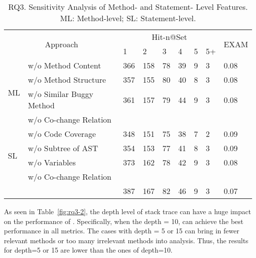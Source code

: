 \begin{table}[t]
	\caption{RQ3. Sensitivity Analysis of Method- and Statement- Level Features. ML: Method-level; SL: Statement-level.}
	{\small
		\begin{center}
			\renewcommand{\arraystretch}{1}
			\begin{tabular}{p{0.3cm}<{\centering}|p{3cm}|p{0.3cm}<{\centering}|p{0.3cm}<{\centering}|p{0.2cm}<{\centering}|p{0.2cm}<{\centering}|p{0.15cm}<{\centering}|p{0.15cm}<{\centering}|p{0.7cm}<{\centering}}
				\hline
				\multicolumn{2}{c|}{\multirow{2}{*}{Approach}}    & \multicolumn{6}{c|}{Hit-n@Set}& \multirow{2}{*}{EXAM}\\
				\cline{3-8}
				                 \multicolumn{2}{c|}{}   &1&2&3&4&5&5+&\\
				
				\hline 
				\multirow{4}{*}{ML}&w/o Method Content              & 366 & 158 & 78  & 39 & 9 & 3   & 0.08\\\cline{2-9}
				&w/o	Method Structure	                        & 357 & 155 & 80  & 40 & 8 & 3   & 0.08\\ \cline{2-9}
				&w/o Similar Buggy Method    	& 361 & 157 & 79  & 44 & 9 & 3   & 0.08\\ \cline{2-9}
				&w/o Co-change Relation          &  &  &   &  &  &    & \\ \cline{2-9}
				\hline
				\multirow{4}{*}{SL}&w/o Code Coverage               & 348 & 151 & 75  & 38 & 7 & 2   & 0.09\\\cline{2-9}
				&w/o	Subtree of AST  	        & 354 & 153 & 77  & 41 & 8 & 3   & 0.09\\ \cline{2-9}
				&w/o Variables               	& 373 & 162 & 78  & 42 & 9 & 3   & 0.08\\ \cline{2-9}
				&w/o Co-change Relation          &  &  &   &  &  &    & \\ \cline{2-9}
				\hline
			&	\tool                           & 387 & 167 & 82  & 46 & 9 & 3   & 0.07\\ \cline{2-9}
				\hline
			\end{tabular}
			
			\label{fig:rq3-1}
		\end{center}
	}
\end{table}

As seen in Table~\ref{fig:rq3-2}, the depth level of stack trace can have a huge impact on the performance of {\tool}. Specifically, when the depth = 10, {\tool} can achieve the best performance in all metrics. The cases with depth = 5 or 15 can bring in fewer relevant methods or too many irrelevant methods into analysis. Thus, the results for depth=5 or 15 are lower than the ones of depth=10. 

